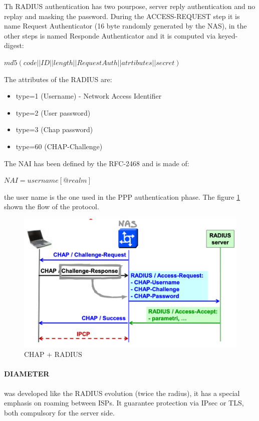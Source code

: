 \documentclass[12pt]{article}
\begin{document}
Th RADIUS authentication has two pourpose, server reply authentication and no replay and masking the password. During the ACCESS-REQUEST step it is name Request Authenticator (16 byte randomly generated by the NAS), in the other steps is named Responde Authenticator and it is computed via keyed-digest:
\begin{center}
  $md5(code||ID||length||RequestAuth||atrtibutes||secret)$
\end{center}
The attributes of the RADIUS are:
\begin{itemize}
  \item type=1 (Username) - Network Access Identifier
  \item type=2 (User password)
  \item type=3 (Chap password)
  \item type=60 (CHAP-Challenge)
\end{itemize}
The NAI has been defined by the RFC-2468 and is made of:
\begin{center}
  $NAI=username[@realm]$
\end{center}
the user name is the one used in the PPP authentication phase. The figure \ref{fig:chap_radius} shown the flow of the protocol.
\begin{figure}[H]
   \centering
   \includegraphics[width=\linewidth]{images/chap_radius.png}
   \caption{CHAP + RADIUS}
   \label{fig:chap_radius}
\end{figure}

\paragraph{DIAMETER} was developed like the RADIUS evolution (twice the radius), it has a special emphasis on roaming between ISPs. It guarantee protection via IPsec or TLS, both compulsory for the server side.
\end{document}
